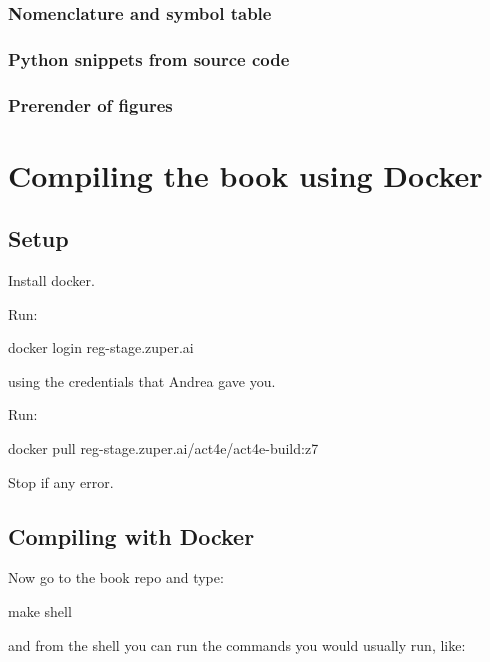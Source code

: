 \subsubsection{Nomenclature and symbol table}


\subsubsection{Python snippets from source code}


\subsubsection{Prerender of figures}



\section{Compiling the book using Docker}

\subsection{Setup}

Install docker.

Run:

\begin{console}
  docker login reg-stage.zuper.ai
\end{console}

using the credentials that Andrea gave you.

Run:

\begin{console}
  docker pull reg-stage.zuper.ai/act4e/act4e-build:z7
\end{console}

Stop if any error.

\subsection{Compiling with Docker}

Now go to the book repo and type:

\begin{console}
  make shell
\end{console}

and from the shell you can run the commands you would usually run, like:

